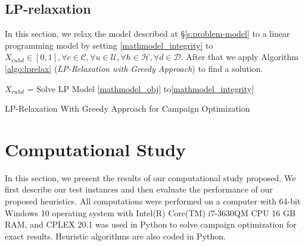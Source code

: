 \documentclass[11pt]{article}
\begin{document}
\subsection{LP-relaxation} \label{s:lp_relaxation_heuristic}
In this section, we relax the model described at \S \ref{s:problem-model} to a linear programming model by setting \eqref{mathmodel_integrity} to $X_{{c}{u}{h}{d}} \in [0,1],\forall c \in \mathcal{C}, \forall u \in \mathcal{U}, \forall h \in \mathcal{H}, \forall d \in \mathcal{D}$. After that we apply Algorithm \ref{algo:lprelax} (\textit{LP-Relaxation with Greedy Approach}) to find a solution.\\
\begin{algorithm}[H]
\DontPrintSemicolon
{}

  \;
$X_{{c}{u}{h}{d}}$ = Solve LP Model \eqref{mathmodel_obj} to\eqref{mathmodel_integrity}

\;
\caption{LP-Relaxation With Greedy Approach for Campaign Optimization}
\label{algo:lprelax}
\end{algorithm}

\newpage
\section{Computational Study} \label{s:num-analysis}

In this section, we present the results of our computational study proposed. We first describe our test instances and then evaluate the performance of our proposed heuristics. All computations were performed on a computer with 64-bit Windows 10 operating system with Intel(R) Core(TM) i7-3630QM CPU 16 GB RAM, and CPLEX 20.1 was used in Python to solve campaign optimization for exact results. Heuristic algorithms are also coded in Python.
\end{document}
